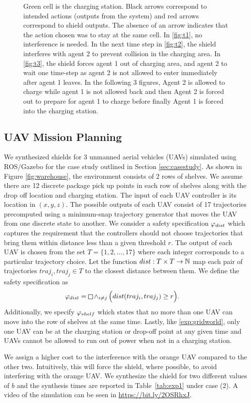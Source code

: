 \begin{figure}[h]
	
	\caption[Gridworld simulaiton of multi-agent shielding interference]{Green cell is the charging station. Black arrows correspond to intended actions (outputs from the system) and red arrows correspond to shield outputs. The absence of an arrow indicates that the action chosen was to stay at the same cell. In \ref{fig:t1}, no interference is needed. In the next time step in \ref{fig:t2}, the shield interferes with agent 2 to prevent collision in the charging area. In \ref{fig:t3}, the shield forces agent 1 out of charging area, and agent 2 to wait one time-step as agent 2 is not allowed to enter immediately after agent 1 leaves. In the following 3 figures, Agent 2 is allowed to charge while agent 1 is not allowed back and then Agent 2 is forced out to prepare for agent 1 to charge before finally Agent 1 is forced into the charging station. }
	\label{fig:casestudies}
\end{figure}


\subsection{UAV Mission Planning}\label{sec:results_casestudy}
We synthesized shields for 3 unmanned aerial vehicles (UAVs) simulated using ROS/Gazebo for the case study outlined in Section \ref{sec:casestudy}. As shown in Figure \ref{fig:warehouse}, the environment consists of 2 rows of shelves. We assume there are 12 discrete package pick up points in each row of shelves along with the drop off location and charging station. The input of each UAV controller is its location in $(x,y,z)$. The possible outputs of each UAV consist of 17 trajectories precomputed using a minimum-snap trajectory generator that moves the UAV from one discrete state to another.
We consider a safety specification $\varphi_{dist}$ which captures the requirement that the controllers should not choose trajectories that bring them within distance less than a given threshold $r$. The output of each UAV is chosen from the set $T = \{1,2,\ldots,17\}$ where each integer corresponds to a particular trajectory choice. Let the function $dist: T \times T \to \mathbb{N}$  map each pair of trajectories $traj_i,traj_j \in T$ to the closest distance between them. 
We define the safety specification as
  \begin{align}
  \spec_{dist}&= \LTLglobally \LTLand_{i\neq j}\Big(dist(traj_i,traj_j) \geq r\Big).
  \end{align}
 Additionally, we specify $\varphi_{shelf}$ which states that no more than one UAV can move into the row of shelves at the same time. Lastly, like \ref{exp:gridworld}, only one UAV can be at the charging station or drop-off point at any given time and UAVs cannot be allowed to run out of power when not in a charging station. 

We assign a higher cost to the interference with the orange UAV compared to the other two. Intuitively, this will force the shield, where possible, to avoid interfering with the orange UAV. We synthesize the shield for two different values of $b$ and the synthesis times are reported in Table~\ref{tab:exp1} under case (2). A video of the simulation can be seen in \url{https://bit.ly/2OSRhxJ}.

